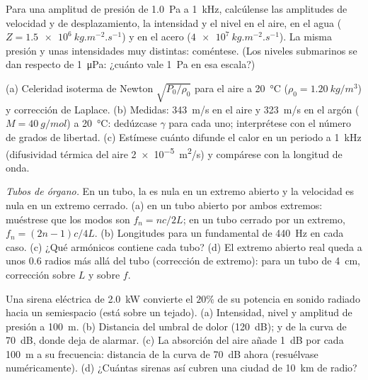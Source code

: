 \begin{exercise}[$\star\star$]\label{exo:b2:sound-waves:6}
Para una amplitud de presión de \qty{1.0}{Pa} a \qty{1}{kHz}, calcúlense las
amplitudes de velocidad y de desplazamiento, la intensidad y el nivel en
el aire, en el agua ($Z = \qty{1.5e6}{kg.m^{-2}.s^{-1}}$) y en el acero
($\qty{4e7}{kg.m^{-2}.s^{-1}}$). La misma presión y unas intensidades muy
distintas: coméntese. (Los niveles submarinos se dan respecto de \qty{1}{\micro Pa}: ¿cuánto
vale \qty{1}{Pa} en esa escala?)
\end{exercise}

\begin{exercise}[$\star\star$]\label{exo:b2:sound-waves:7}
(a) Celeridad isoterma de Newton $\sqrt{P_0/\rho_0}$ para el aire a
\qty{20}{\degreeCelsius} ($\rho_0 = \qty{1.20}{kg/m^3}$) y corrección de Laplace.
(b) Medidas: \qty{343}{m/s} en el aire y \qty{323}{m/s} en el argón ($M = \qty{40}{g/mol}$)
a \qty{20}{\degreeCelsius}: dedúzcase $\gamma$ para cada uno; interprétese con
el número de grados de libertad. (c) Estímese cuánto difunde el calor en
un periodo a \qty{1}{kHz} (difusividad térmica del aire
\qty{2e-5}{m^2/s}) y compárese con la longitud de onda.
\end{exercise}

\begin{exercise}[$\star\star$]\label{exo:b2:sound-waves:8}
\emph{Tubos de órgano.} En un tubo, la  es nula en un extremo
abierto y la velocidad es nula en un extremo cerrado. (a)  en un tubo abierto por ambos extremos: muéstrese que los modos son $f_n = nc/2L$; en un tubo cerrado por
un extremo, $f_n = (2n - 1)c/4L$. (b) Longitudes para un fundamental de \qty{440}{Hz}
en cada caso. (c) ¿Qué armónicos contiene cada tubo? (d) El extremo
abierto real queda a unos $0.6$ radios más allá del tubo (corrección de
extremo): para un tubo de \qty{4}{cm}, corrección sobre $L$ y sobre $f$.
\end{exercise}

\begin{exercise}[$\star\star$]\label{exo:b2:sound-waves:9}
Una sirena eléctrica de \qty{2.0}{kW} convierte el $20\%$ de su potencia en
sonido radiado hacia un semiespacio (está sobre un tejado). (a) Intensidad, nivel
y amplitud de presión a \qty{100}{m}. (b) Distancia del umbral de dolor
(\qty{120}{dB}); y de la curva de \qty{70}{dB}, donde deja de alarmar.
(c) La absorción del aire añade \qty{1}{dB} por cada \qty{100}{m} a su
frecuencia: distancia de la curva de \qty{70}{dB} ahora (resuélvase
numéricamente). (d) ¿Cuántas sirenas así cubren una ciudad de \qty{10}{km} de radio?
\end{exercise}

